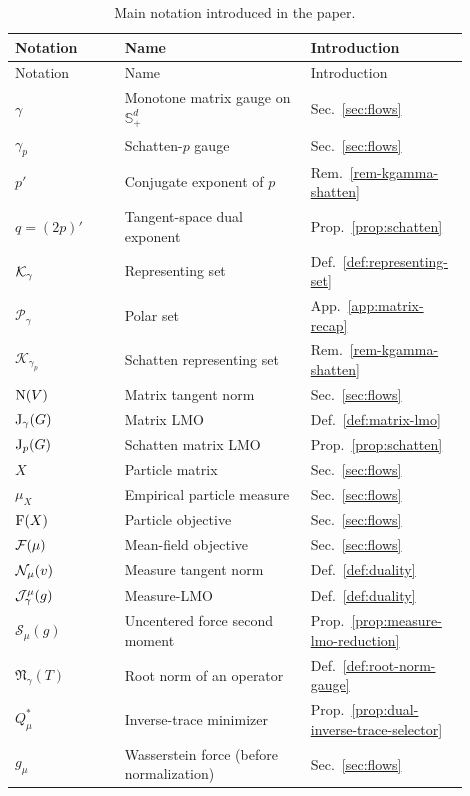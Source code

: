 \begin{longtable}{@{}p{0.23\linewidth}p{0.39\linewidth}p{0.28\linewidth}@{}}
\caption{Main notation introduced in the paper.}\label{tab:notation-paper}\\
\toprule
Notation & Name & Introduction \\
\midrule
\endfirsthead
\toprule
Notation & Name & Introduction \\
\midrule
\endhead
\bottomrule
\endfoot
$\gamma$ & Monotone matrix gauge on $\mathbb S_+^d$ & Sec.~\ref{sec:flows} \\
$\gamma_p$ & Schatten-$p$ gauge & Sec.~\ref{sec:flows} \\
$p'$ & Conjugate exponent of $p$ & Rem.~\ref{rem-kgamma-shatten} \\
$q=(2p)'$ & Tangent-space dual exponent & Prop.~\ref{prop:schatten} \\
$\mathcal K_\gamma$ & Representing set & Def.~\ref{def:representing-set} \\
$\mathcal P_\gamma$ & Polar set & App.~\ref{app:matrix-recap} \\
$\mathcal K_{\gamma_p}$ & Schatten representing set & Rem.~\ref{rem-kgamma-shatten} \\
$\mathrm{N}(V)$ & Matrix tangent norm & Sec.~\ref{sec:flows} \\
$\mathrm{J}_\gamma(G)$ & Matrix LMO & Def.~\ref{def:matrix-lmo} \\
$\mathrm{J}_p(G)$ & Schatten matrix LMO & Prop.~\ref{prop:schatten} \\
$X$ & Particle matrix & Sec.~\ref{sec:flows} \\
$\mu_X$ & Empirical particle measure & Sec.~\ref{sec:flows} \\
$\mathrm{F}(X)$ & Particle objective & Sec.~\ref{sec:flows} \\
$\mathcal{F}(\mu)$ & Mean-field objective & Sec.~\ref{sec:flows} \\
$\mathcal{N}_\mu(v)$ & Measure tangent norm & Def.~\ref{def:duality} \\
$\mathcal{J}_\gamma^\mu(g)$ & Measure-LMO & Def.~\ref{def:duality} \\
$\mathcal S_\mu(g)$ & Uncentered force second moment & Prop.~\ref{prop:measure-lmo-reduction} \\
$\mathfrak N_\gamma(T)$ & Root norm of an operator & Def.~\ref{def:root-norm-gauge} \\
$Q_\mu^*$ & Inverse-trace minimizer & Prop.~\ref{prop:dual-inverse-trace-selector} \\
$g_\mu$ & Wasserstein force (before normalization) & Sec.~\ref{sec:flows} \\

\end{longtable}
